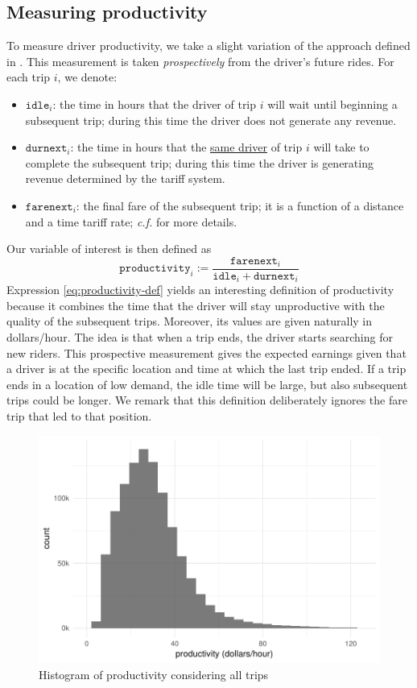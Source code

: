 \documentclass[11pt]{article}
\begin{document}
\subsection{Measuring productivity}

To measure driver productivity, we take a slight variation of the approach defined in \citep{zuniga-etal-2018}. This measurement is taken \textit{prospectively} from the driver's future rides. For each trip $i$, we denote:
\begin{itemize}\itemsep0em 
    \item $\mathtt{idle}_i$: the time in hours that the driver of trip $i$ will wait until beginning a subsequent trip; during this time the driver does not generate any revenue.
    \item $\mathtt{durnext}_i$: the time in hours that the \underline{same driver} of trip $i$ will take to complete the subsequent trip; during this time the driver is generating revenue determined by the tariff system.
    \item $\mathtt{farenext}_i$: the final fare of the subsequent trip; it is a function of a distance and a time tariff rate; \textit{c.f.} \citep{zuniga-etal-2018} for more details.
\end{itemize}
Our variable of interest is then defined as 
\begin{equation}
    \label{eq:productivity-def}
    \mathtt{productivity}_i := \frac{\mathtt{farenext}_i}{\mathtt{idle}_i + \mathtt{durnext}_i}
\end{equation}
Expression \eqref{eq:productivity-def} yields an interesting definition of productivity because it combines the time that the driver will stay unproductive with the quality of the subsequent trips. Moreover, its values are given naturally in dollars/hour. The idea is that when a trip ends, the driver starts searching for new riders. This prospective measurement gives the expected earnings given that a driver is at the specific location and time at which the last trip ended. If a trip ends in a location of low demand, the idle time will be large, but also subsequent trips could be longer. We remark that this definition deliberately ignores the fare trip that led to that position.

\begin{figure}[htb]
    \centering
    \includegraphics[width=0.65\linewidth]{img/prodhist_global.pdf}
    \caption{Histogram of productivity considering all trips}
    \label{fig:prodhist}
\end{figure}
\end{document}
